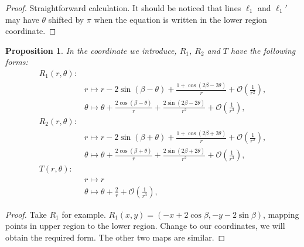 \documentclass{article}
\numberwithin{figure}{section}
\numberwithin{equation}{section}
\newtheorem{proposition}[lemma]{Proposition}
\theoremstyle{remark}
\theoremstyle{definition}
\begin{document}
\begin{proof}
	Straightforward calculation. It should be noticed that lines $\ell_1$ and $\ell_1'$ may have $\theta$ shifted by $\pi$ when the equation is written in the lower region coordinate.
\end{proof}

\begin{proposition}
	In the coordinate we introduce, $R_1$, $R_2$ and $T$ have the following forms:
	\begin{align*}
		R_1\left(r, \theta \right):&\\
		&r\mapsto  r-2\sin\left(\beta-\theta\right)+\frac{1+\cos\left(2\beta-2\theta\right)}{r}+\mathcal{O}\left(\frac{1}{r^2}\right),\\
		&\theta\mapsto\theta+\frac{2\cos\left(\beta-\theta\right)}{r}+\frac{2\sin\left(2\beta-2\theta\right)}{r^2}+\mathcal{O}\left(\frac{1}{r^3}\right),\\		
		R_2\left(r, \theta \right):&\\
		&r\mapsto  r-2\sin\left(\beta+\theta\right)+\frac{1+\cos\left(2\beta+2\theta\right)}{r}+\mathcal{O}\left(\frac{1}{r^2}\right),\\
		&\theta\mapsto\theta+\frac{2\cos\left(\beta+\theta\right)}{r}+\frac{2\sin\left(2\beta+2\theta\right)}{r^2}+\mathcal{O}\left(\frac{1}{r^3}\right),		\\
		T\left(r, \theta \right):&\\
		&r\mapsto r\\
		&\theta\mapsto\theta+\frac{2}{r}+\mathcal{O}\left(\frac{1}{r^3}\right),		
	\end{align*}
\end{proposition}

\begin{proof}
	Take $R_1$ for example. $R_1\left(x,y\right)=\left(-x+2\cos\beta,-y-2\sin\beta\right)$,  mapping points in upper region to the lower region. Change to our coordinates, we will obtain the required form. The other two maps are similar.
\end{proof}
\end{document}
